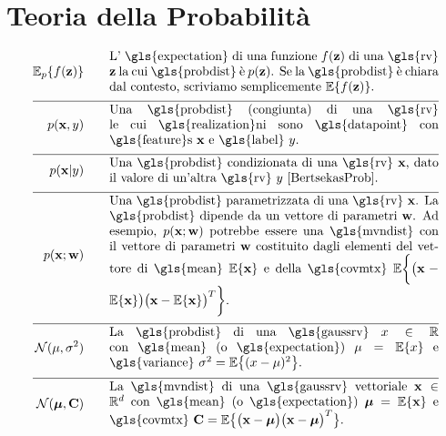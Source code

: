 \newpage
\section*{Teoria della Probabilità} 
\begin{align}
	\expect_{p} \{ f(\datapoint) \}  \quad\quad & \parbox{.75\textwidth}{L' \gls{expectation} di una funzione $f(\datapoint)$ di una \gls{rv} 
		$\datapoint$ la cui \gls{probdist} è $\prob{\datapoint}$. Se la \gls{probdist} è chiara dal contesto, scriviamo semplicemente $\expect \{ f(\datapoint) \}$. }  \nonumber \\[2mm] \hline \nonumber\\[-5mm]    
	\prob{\featurevec,\truelabel} \quad\quad & \parbox{.75\textwidth}{Una \gls{probdist} (congiunta) di una \gls{rv} 
		le cui \gls{realization}ni  sono \gls{datapoint} con \gls{feature}s $\featurevec$ e \gls{label} $\truelabel$.} \nonumber        \nonumber \\[2mm] \hline \nonumber\\[-5mm]        
	\prob{\featurevec|\truelabel} \quad\quad & \parbox{.75\textwidth}{Una \gls{probdist} condizionata di una \gls{rv} 
		$\featurevec$, dato il valore di un'altra \gls{rv} $\truelabel$ \cite[Sec.\ 3.5]{BertsekasProb}. } \nonumber       \nonumber \\[2mm] \hline \nonumber\\[-5mm]           
	\prob{\featurevec;\weights} \quad\quad & \parbox{.75\textwidth}{Una \gls{probdist} parametrizzata di una \gls{rv} $\featurevec$. 
		La \gls{probdist} dipende da un vettore di parametri $\weights$. Ad esempio, $\prob{\featurevec;\weights}$ potrebbe essere una
		\gls{mvndist} con il vettore di parametri $\weights$ costituito dagli elementi del vettore di \gls{mean} $\expect \{ \featurevec \}$ 
		e della \gls{covmtx} $\expect \bigg \{ \big( \featurevec - \expect \{ \featurevec \}\big) \big( \featurevec - \expect \{ \featurevec \}\big)^{T}  \bigg\}$.} \nonumber           \nonumber \\[2mm] \hline \nonumber\\[-5mm]
	\mathcal{N}(\mu, \sigma^{2}) \quad\quad & \parbox{.75\textwidth}{La \gls{probdist} di una 
		\gls{gaussrv} $\feature \in \mathbb{R}$ con \gls{mean} (o \gls{expectation}) $\mu= \expect \{ \feature \}$ 
		e \gls{variance} $\sigma^{2} =   \expect \big\{  (  \feature - \mu )^2 \big\}$.} \nonumber    \nonumber \\[2mm] \hline \nonumber\\[-5mm]
	\mathcal{N}(\clustermean, \mathbf{C}) \quad\quad & \parbox{.75\textwidth}{La \gls{mvndist} di una		\gls{gaussrv} vettoriale $\featurevec \in \mathbb{R}^{\featuredim}$ con \gls{mean} (o \gls{expectation}) $\clustermean= \expect \{ \featurevec \}$ 
		e \gls{covmtx} $\mathbf{C} =  \expect \big\{ \big( \featurevec - \clustermean \big)\big( \featurevec - \clustermean \big)^{T} \big\}$.} \nonumber                                             
\end{align}





